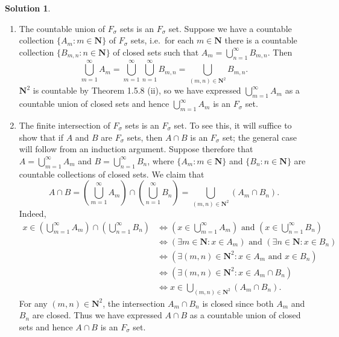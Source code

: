 \documentclass[12pt]{article}
\theoremstyle{definition}
\theoremstyle{exercise}
\theoremstyle{solution}
\newtheorem*{solution}{Solution}
\newcommand{\N}{\mathbf{N}}
\begin{document}
\begin{solution}
    \begin{enumerate}
        \item The countable union of \( F_{\sigma} \) sets is an \( F_{\sigma} \) set. Suppose we have a countable collection \( \{ A_m : m \in \N \} \) of \( F_{\sigma} \) sets, i.e.\ for each \( m \in \N \) there is a countable collection \( \{ B_{m,n} : n \in \N \} \) of closed sets such that \( A_m = \bigcup_{n=1}^{\infty} B_{m,n} \). Then
        \[
            \bigcup_{m=1}^{\infty} A_m = \bigcup_{m=1}^{\infty} \bigcup_{n=1}^{\infty} B_{m,n} = \bigcup_{(m, n) \in \N^2} B_{m,n}.
        \]
        \( \N^2 \) is countable by Theorem 1.5.8 (ii), so we have expressed \( \bigcup_{m=1}^{\infty} A_m \) as a countable union of closed sets and hence \( \bigcup_{m=1}^{\infty} A_m \) is an \( F_{\sigma} \) set.

        \item The finite intersection of \( F_{\sigma} \) sets is an \( F_{\sigma} \) set. To see this, it will suffice to show that if \( A \) and \( B \) are \( F_{\sigma} \) sets, then \( A \cap B \) is an \( F_{\sigma} \) set; the general case will follow from an induction argument. Suppose therefore that \( A = \bigcup_{m=1}^{\infty} A_m \) and \( B = \bigcup_{n=1}^{\infty} B_n \), where \( \{ A_m : m \in \N \} \) and \( \{ B_n : n \in \N \} \) are countable collections of closed sets. We claim that
        \[
            A \cap B = \left( \bigcup_{m=1}^{\infty} A_m \right) \cap \left( \bigcup_{n=1}^{\infty} B_n \right) = \bigcup_{(m, n) \in \N^2} (A_m \cap B_n).
        \]
        Indeed,
        \begin{align*}
            \textstyle x \in \left( \bigcup_{m=1}^{\infty} A_m \right) \cap \left( \bigcup_{n=1}^{\infty} B_n \right) &\iff \textstyle \left( x \in \bigcup_{m=1}^{\infty} A_m \right) \text{ and } \left( x \in \bigcup_{n=1}^{\infty} B_n \right) \\
            &\iff (\exists m \in \N : x \in A_m) \text{ and } (\exists n \in \N : x \in B_n) \\
            &\iff (\exists (m, n) \in \N^2 : x \in A_m \text{ and } x \in B_n) \\
            &\iff (\exists (m, n) \in \N^2 : x \in A_m \cap B_n) \\
            &\iff \textstyle x \in \bigcup_{(m, n) \in \N^2} (A_m \cap B_n).
        \end{align*}
        For any \( (m, n) \in \N^2 \), the intersection \( A_m \cap B_n \) is closed since both \( A_m \) and \( B_n \) are closed. Thus we have expressed \( A \cap B \) as a countable union of closed sets and hence \( A \cap B \) is an \( F_{\sigma} \) set.


\end{enumerate}
\end{solution}
\end{document}
